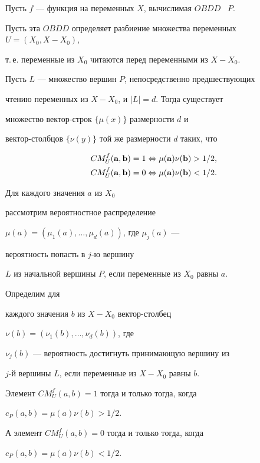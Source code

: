 \begin{lem}


Пусть $f$ --- функция на переменных $X$, вычислимая $OBDD$ \ $P$.


Пусть эта $OBDD$ определяет разбиение множества переменных $U=(X_0,X-X_0)$,


т.\,е. переменные из $X_0$ читаются перед переменными из $X-X_0$.


Пусть $L$ --- множество вершин $P$, непосредственно предшествующих


чтению переменных из $X-X_0$, и $|L|=d$. Тогда существует


множество вектор-строк $\{\mu(x)\}$ размерности $d$ и


вектор-столбцов $\{\nu(y)\}$ той же размерности $d$ таких, что


\begin{align*}


CM^f_{U}({\bold a},{\bold b})&=1 \Leftrightarrow


\mu ({\bold a})\nu ({\bold b}) >1/2,\\


CM^f_{U}({\bold a},{\bold b})&=0 \Leftrightarrow


\mu ({\bold a})\nu ({\bold b}) <1/2.


\end{align*}


\end{lem}








\begin{pf}


Для каждого значения $a$ из $X_0$


рассмотрим вероятностное распределение


$\mu(a)=(\mu_1(a),\dotsc,\mu_d(a))$, где $\mu_j(a)$ ---


вероятность попасть в $j$-ю вершину


$L$ из начальной вершины $P$, если переменные из $X_0$ равны $a$.


Определим для


каждого значения $b$ из $X-X_0$ вектор-столбец


$\nu(b)=(\nu_1(b),\dotsc,\nu_d(b))$, где


$\nu_j(b)$ --- вероятность достигнуть принимающую вершину из


$j$-й вершины $L$, если переменные из $X-X_0$ равны $b$.


Элемент $CM_U^f(a,b)=1$ тогда и только тогда, когда


$c_P(a,b)=\mu(a)\nu(b)>1/2$.


А элемент $CM_U^f(a,b)=0$ тогда и только тогда, когда


$c_P(a,b)=\mu(a)\nu(b)<1/2$.


\end{pf}





